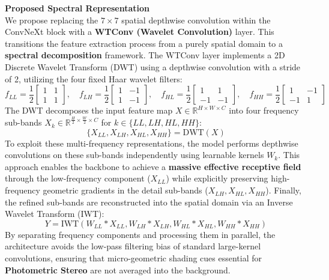 \documentclass[Main.tex]{subfiles}
\begin{document}
\textbf{Proposed Spectral Representation} \\
We propose replacing the $7 \times 7$ spatial depthwise convolution within the ConvNeXt block with a \textbf{WTConv (Wavelet Convolution)} layer. This transitions the feature extraction process from a purely spatial domain to a \textbf{spectral decomposition} framework. The WTConv layer implements a 2D Discrete Wavelet Transform (DWT) using a depthwise convolution with a stride of 2, utilizing the four fixed Haar wavelet filters:
\begin{equation}
    f_{LL} = \frac{1}{2} \begin{bmatrix} 1 & 1 \\ 1 & 1 \end{bmatrix}, \quad
    f_{LH} = \frac{1}{2} \begin{bmatrix} 1 & -1 \\ 1 & -1 \end{bmatrix}, \quad
    f_{HL} = \frac{1}{2} \begin{bmatrix} 1 & 1 \\ -1 & -1 \end{bmatrix}, \quad
    f_{HH} = \frac{1}{2} \begin{bmatrix} 1 & -1 \\ -1 & 1 \end{bmatrix}
\end{equation}
The DWT decomposes the input feature map $X \in \mathbb{R}^{H \times W \times C}$ into four frequency sub-bands $X_k \in \mathbb{R}^{\frac{H}{2} \times \frac{W}{2} \times C}$ for $k \in \{LL, LH, HL, HH\}$:
\begin{equation}
    \{X_{LL}, X_{LH}, X_{HL}, X_{HH}\} = \text{DWT}(X)
\end{equation}
To exploit these multi-frequency representations, the model performs depthwise convolutions on these sub-bands independently using learnable kernels $W_k$. This approach enables the backbone to achieve a \textbf{massive effective receptive field} through the low-frequency component ($X_{LL}$) while explicitly preserving high-frequency geometric gradients in the detail sub-bands ($X_{LH}, X_{HL}, X_{HH}$). Finally, the refined sub-bands are reconstructed into the spatial domain via an Inverse Wavelet Transform (IWT):
\begin{equation}
    Y = \text{IWT}(W_{LL} * X_{LL}, W_{LH} * X_{LH}, W_{HL} * X_{HL}, W_{HH} * X_{HH})
\end{equation}
By separating frequency components and processing them in parallel, the architecture avoids the low-pass filtering bias of standard large-kernel convolutions, ensuring that micro-geometric shading cues essential for \textbf{Photometric Stereo} are not averaged into the background.
\end{document}
